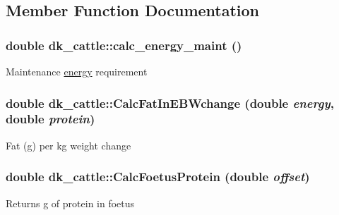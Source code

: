 \subsection{Member Function Documentation}
\hypertarget{classdk__cattle_aecbc80f8b09fd9b7e31b3cba2c6fe7b5}{
\subsubsection[{calc\_\-energy\_\-maint}]{\setlength{\rightskip}{0pt plus 5cm}double dk\_\-cattle::calc\_\-energy\_\-maint ()}}
\label{classdk__cattle_aecbc80f8b09fd9b7e31b3cba2c6fe7b5}
Maintenance \hyperlink{classenergy}{energy} requirement \hypertarget{classdk__cattle_affb783822317f9745f837efaaca3d098}{
\subsubsection[{CalcFatInEBWchange}]{\setlength{\rightskip}{0pt plus 5cm}double dk\_\-cattle::CalcFatInEBWchange (double {\em energy}, \/  double {\em protein})}}
\label{classdk__cattle_affb783822317f9745f837efaaca3d098}
Fat (g) per kg weight change \hypertarget{classdk__cattle_a717bc099891c28ae2f35203a23bc1b12}{
\subsubsection[{CalcFoetusProtein}]{\setlength{\rightskip}{0pt plus 5cm}double dk\_\-cattle::CalcFoetusProtein (double {\em offset})}}
\label{classdk__cattle_a717bc099891c28ae2f35203a23bc1b12}
Returns g of protein in foetus 


